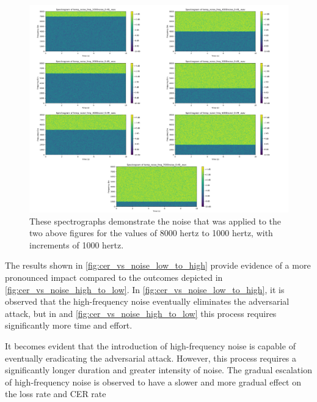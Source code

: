 \documentclass[11pt,a4paper]{article}
\begin{document}
\begin{figure}
  \centering
  \includegraphics[width=1.0\textwidth]{images/spectrograms_high_to_low.png}
  \caption{These spectrographs demonstrate the noise that was applied to the two above figures for the values of 8000 hertz to 1000 hertz, with increments of 1000 hertz.}
  \label{fig:spectrograms_high_to_low}
\end{figure}

The results shown in \autoref{fig:cer_vs_noise_low_to_high} provide evidence of
a more pronounced impact compared to the outcomes depicted in \autoref{fig:cer_vs_noise_high_to_low}.
In \autoref{fig:cer_vs_noise_low_to_high}, it is observed that the
high-frequency noise eventually eliminates the adversarial attack, but in
and \autoref{fig:cer_vs_noise_high_to_low} this process requires significantly
more time and effort.

It becomes evident that the introduction of high-frequency noise is capable of
eventually eradicating the adversarial attack. However, this process requires a
significantly longer duration and greater intensity of noise. The gradual
escalation of high-frequency noise is observed to have a slower and more gradual
effect on the loss rate and CER rate
\end{document}

